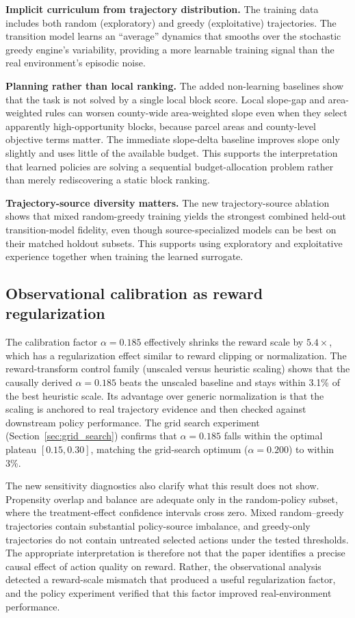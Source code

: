 \documentclass[11pt]{article}
\begin{document}
\textbf{Implicit curriculum from trajectory distribution.} The training data includes both random (exploratory) and greedy (exploitative) trajectories. The transition model learns an ``average'' dynamics that smooths over the stochastic greedy engine's variability, providing a more learnable training signal than the real environment's episodic noise.

\textbf{Planning rather than local ranking.} The added non-learning baselines show that the task is not solved by a single local block score. Local slope-gap and area-weighted rules can worsen county-wide area-weighted slope even when they select apparently high-opportunity blocks, because parcel areas and county-level objective terms matter. The immediate slope-delta baseline improves slope only slightly and uses little of the available budget. This supports the interpretation that learned policies are solving a sequential budget-allocation problem rather than merely rediscovering a static block ranking.

\textbf{Trajectory-source diversity matters.} The new trajectory-source ablation shows that mixed random-greedy training yields the strongest combined held-out transition-model fidelity, even though source-specialized models can be best on their matched holdout subsets. This supports using exploratory and exploitative experience together when training the learned surrogate.

\subsection{Observational calibration as reward regularization}

The calibration factor $\alpha = 0.185$ effectively shrinks the reward scale by $5.4\times$, which has a regularization effect similar to reward clipping or normalization. The reward-transform control family (unscaled versus heuristic scaling) shows that the causally derived $\alpha = 0.185$ beats the unscaled baseline and stays within 3.1\% of the best heuristic scale. Its advantage over generic normalization is that the scaling is anchored to real trajectory evidence and then checked against downstream policy performance. The grid search experiment (Section~\ref{sec:grid_search}) confirms that $\alpha = 0.185$ falls within the optimal plateau $[0.15, 0.30]$, matching the grid-search optimum ($\alpha = 0.200$) to within 3\%.

The new sensitivity diagnostics also clarify what this result does not show. Propensity overlap and balance are adequate only in the random-policy subset, where the treatment-effect confidence intervals cross zero. Mixed random--greedy trajectories contain substantial policy-source imbalance, and greedy-only trajectories do not contain untreated selected actions under the tested thresholds. The appropriate interpretation is therefore not that the paper identifies a precise causal effect of action quality on reward. Rather, the observational analysis detected a reward-scale mismatch that produced a useful regularization factor, and the policy experiment verified that this factor improved real-environment performance.
\end{document}
